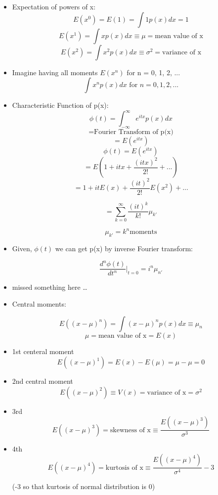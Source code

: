 \begin{itemize}
    \item Expectation of powers of x:
    \[ E(x^0) = E(1) = \int 1 p(x) dx = 1\]
    \[ E(x^1) = \int x p(x) dx \equiv \mu = \text{mean value of x}\]
    \[ E(x^2) = \int x^2 p(x) dx \equiv \sigma^2 = \text{variance of x}\]

    \item Imagine having all moments $E(x^n)$ for n = 0, 1, 2, ...
    \[ \int x^n p(x) dx \text{ for } n = 0, 1, 2, ...\]

    \item Characteristic Function of p(x):
    \[ \phi(t) = \int_{-\infty}^{\infty} e^{itx} p(x) dx \]
    \[ = \text{Fourier Transform of p(x)}\]
    \[ = E(e^{itx})\]
    \[ \phi(t) = E(e^{itx}) \]
    \[ = E (1 + i t x + \frac{(itx)^2}{2!} + ... ) \]
    \[ = 1 + it E(x) + \frac{(it)^2}{2!} E(x^2) + ... \]
    
    \[ = \sum_{k=0}^{\infty} \frac{(it)^k}{k!} \mu_{k'} \]

    \[ \mu_{k'} = k^n \text{moments} \]
    
    \item Given, $\phi(t)$ we can get p(x) by inverse Fourier transform:
    
    \[ \frac{d^n \phi(t)}{dt^n} \left| \right._{t=0} = i^n \mu_{n'} \]

    \item missed something here \dots
    
    \item Central moments:
    
    \[ E((x-\mu)^n) = \int (x-\mu)^n p(x) dx \equiv \mu_n \]
    \[ \mu = \text{mean value of x} = E(x) \]
    \item 1st centeral moment
    \[ E((x-\mu)^1) = E(x) - E(\mu) = \mu - \mu = 0\]
    \item 2nd central moment
    \[ E((x-\mu)^2) \equiv V(x) = \text{variance of x} = \sigma^2 \]
    \item 3rd 
    \[ E((x-\mu)^3) = \text{skewness of x} \equiv \frac{E((x-\mu)^3)}{\sigma^3} \]
    \item 4th
    \[ E((x-\mu)^4) = \text{kurtosis of x} \equiv \frac{E((x-\mu)^4)}{\sigma^4} - 3 \]

    (-3 so that kurtosis of normal distribution is 0)
\end{itemize}
